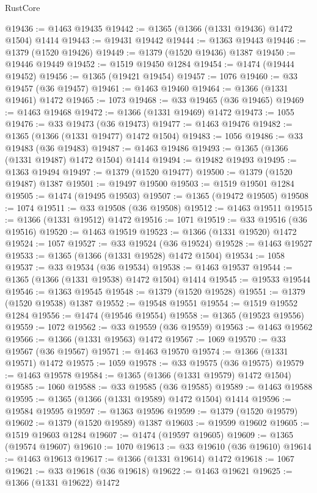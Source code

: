 \begin{lexlean}{RustCore}
\begin{coremodule}
@19436 := @1463 @19435
@19442 := @1365 (@1366 (@1331 @19436) @1472 @1504) @1414
@19443 := @19431 @19442
@19444 := @1363 @19443
@19446 := @1379 (@1520 @19426)
@19449 := @1379 (@1520 @19436) @1387
@19450 := @19446 @19449
@19452 := @1519 @19450 @1284
@19454 := @1474 (@19444 @19452)
@19456 := @1365 (@19421 @19454)
@19457 := 1076
@19460 := @33 @19457 (@36 @19457)
@19461 := @1463 @19460
@19464 := @1366 (@1331 @19461) @1472
@19465 := 1073
@19468 := @33 @19465 (@36 @19465)
@19469 := @1463 @19468
@19472 := @1366 (@1331 @19469) @1472
@19473 := 1055
@19476 := @33 @19473 (@36 @19473)
@19477 := @1463 @19476
@19482 := @1365 (@1366 (@1331 @19477) @1472 @1504)
@19483 := 1056
@19486 := @33 @19483 (@36 @19483)
@19487 := @1463 @19486
@19493 := @1365 (@1366 (@1331 @19487) @1472 @1504) @1414
@19494 := @19482 @19493
@19495 := @1363 @19494
@19497 := @1379 (@1520 @19477)
@19500 := @1379 (@1520 @19487) @1387
@19501 := @19497 @19500
@19503 := @1519 @19501 @1284
@19505 := @1474 (@19495 @19503)
@19507 := @1365 (@19472 @19505)
@19508 := 1074
@19511 := @33 @19508 (@36 @19508)
@19512 := @1463 @19511
@19515 := @1366 (@1331 @19512) @1472
@19516 := 1071
@19519 := @33 @19516 (@36 @19516)
@19520 := @1463 @19519
@19523 := @1366 (@1331 @19520) @1472
@19524 := 1057
@19527 := @33 @19524 (@36 @19524)
@19528 := @1463 @19527
@19533 := @1365 (@1366 (@1331 @19528) @1472 @1504)
@19534 := 1058
@19537 := @33 @19534 (@36 @19534)
@19538 := @1463 @19537
@19544 := @1365 (@1366 (@1331 @19538) @1472 @1504) @1414
@19545 := @19533 @19544
@19546 := @1363 @19545
@19548 := @1379 (@1520 @19528)
@19551 := @1379 (@1520 @19538) @1387
@19552 := @19548 @19551
@19554 := @1519 @19552 @1284
@19556 := @1474 (@19546 @19554)
@19558 := @1365 (@19523 @19556)
@19559 := 1072
@19562 := @33 @19559 (@36 @19559)
@19563 := @1463 @19562
@19566 := @1366 (@1331 @19563) @1472
@19567 := 1069
@19570 := @33 @19567 (@36 @19567)
@19571 := @1463 @19570
@19574 := @1366 (@1331 @19571) @1472
@19575 := 1059
@19578 := @33 @19575 (@36 @19575)
@19579 := @1463 @19578
@19584 := @1365 (@1366 (@1331 @19579) @1472 @1504)
@19585 := 1060
@19588 := @33 @19585 (@36 @19585)
@19589 := @1463 @19588
@19595 := @1365 (@1366 (@1331 @19589) @1472 @1504) @1414
@19596 := @19584 @19595
@19597 := @1363 @19596
@19599 := @1379 (@1520 @19579)
@19602 := @1379 (@1520 @19589) @1387
@19603 := @19599 @19602
@19605 := @1519 @19603 @1284
@19607 := @1474 (@19597 @19605)
@19609 := @1365 (@19574 @19607)
@19610 := 1070
@19613 := @33 @19610 (@36 @19610)
@19614 := @1463 @19613
@19617 := @1366 (@1331 @19614) @1472
@19618 := 1067
@19621 := @33 @19618 (@36 @19618)
@19622 := @1463 @19621
@19625 := @1366 (@1331 @19622) @1472

\end{coremodule}
\end{lexlean}
